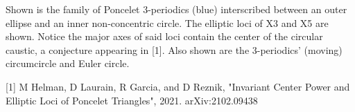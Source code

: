 Shown is the family of Poncelet 3-periodics (blue) interscribed between an outer ellipse and an inner non-concentric circle. The elliptic loci of X3 and X5 are shown. Notice the major axes of said loci contain the center of the circular caustic, a conjecture appearing in [1]. Also shown are the 3-periodics' (moving) circumcircle and Euler circle.

[1] M Helman, D Laurain, R Garcia, and D Reznik, "Invariant Center Power and Elliptic Loci of Poncelet Triangles", 2021. arXiv:2102.09438